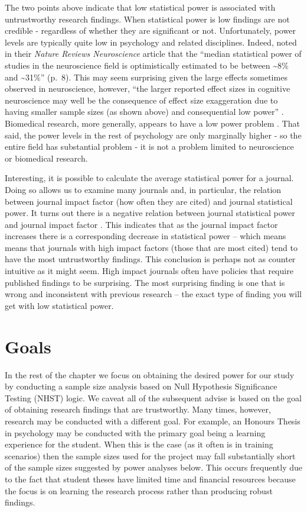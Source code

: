 \documentclass[
]{krantz}
\begin{document}
The two points above indicate that low statistical power is associated with untrustworthy research findings. When statistical power is low findings are not credible - regardless of whether they are significant or not. Unfortunately, power levels are typically quite low in psychology and related disciplines. Indeed, \citep{button2013power} noted in their \emph{Nature Reviews Neuroscience} article that the ``median statistical power of studies in the neuroscience field is optimistically estimated to be between \textasciitilde8\% and \textasciitilde31\%'' (p.~8). This may seem surprising given the large effects sometimes observed in neuroscience, however, ``the larger reported effect sizes in cognitive neuroscience may well be the consequence of effect size exaggeration due to having smaller sample sizes (as shown above) and consequential low power'' \citep[p.~8,][]{szucs2017empirical}. Biomedical research, more generally, appears to have a low power problem \citep{dumas2017low}. That said, the power levels in the rest of psychology are only marginally higher - so the entire field has substantial problem - it is not a problem limited to neuroscience or biomedical research.

Interesting, it is possible to calculate the average statistical power for a journal. Doing so allows us to examine many journals and, in particular, the relation between journal impact factor (how often they are cited) and journal statistical power. It turns out there is a negative relation between journal statistical power and journal impact factor \citep{szucs2017empirical}. This indicates that as the journal impact factor increases there is a corresponding decrease in statistical power -- which means means that journals with high impact factors (those that are most cited) tend to have the most untrustworthy findings. This conclusion is perhaps not as counter intuitive as it might seem. High impact journals often have policies that require published findings to be surprising. The most surprising finding is one that is wrong and inconsistent with previous research -- the exact type of finding you will get with low statistical power.

\hypertarget{goals}{%
\section{Goals}\label{goals}}

In the rest of the chapter we focus on obtaining the desired power for our study by conducting a sample size analysis based on Null Hypothesis Significance Testing (NHST) logic. We caveat all of the subsequent advise is based on the goal of obtaining research findings that are trustworthy. Many times, however, research may be conducted with a different goal. For example, an Honours Thesis in psychology may be conducted with the primary goal being a learning experience for the student. When this is the case (as it often is in training scenarios) then the sample sizes used for the project may fall substantially short of the sample sizes suggested by power analyses below. This occurs frequently due to the fact that student theses have limited time and financial resources because the focus is on learning the research process rather than producing robust findings.
\end{document}

